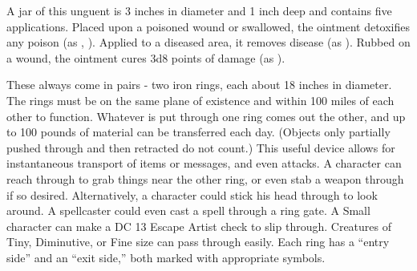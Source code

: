 {

 A jar of this unguent is 3 inches in diameter and 1 inch deep and contains five applications. Placed upon a poisoned wound or swallowed, the ointment detoxifies any poison (as , ). Applied to a diseased area, it removes disease (as ). Rubbed on a wound, the ointment cures 3d8 points of damage (as ).


 These always come in pairs - two iron rings, each about 18 inches in diameter. The rings must be on the same plane of existence and within 100 miles of each other to function. Whatever is put through one ring comes out the other, and up to 100 pounds of material can be transferred each day. (Objects only partially pushed through and then retracted do not count.) This useful device allows for instantaneous transport of items or messages, and even attacks. A character can reach through to grab things near the other ring, or even stab a weapon through if so desired. Alternatively, a character could stick his head through to look around. A spellcaster could even cast a spell through a ring gate. A Small character can make a DC 13 Escape Artist check to slip through. Creatures of Tiny, Diminutive, or Fine size can pass through easily. Each ring has a ``entry side'' and an ``exit side,'' both marked with appropriate symbols.


\begin{comment}
Robe of the Archmagi} This normal-appearing garment can be white (01?45 on d\%, good alignment), gray (46?75, neither good nor evil alignment), or black (76?100, evil alignment). Its wearer, if an arcane spellcaster, gains the following powers.
\begin{itemize}
\item \plus5 armor bonus to AC.
\item Spell resistance 18.
\item \plus4 resistance bonus on all saving throws.
\item \plus2 enhancement bonus on caster level checks made to overcome spell resistance.
\end{itemize}


\end{comment}}
